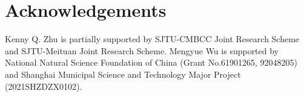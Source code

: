 \section*{Acknowledgements}
Kenny Q. Zhu is partially supported by SJTU-CMBCC Joint Research Scheme and SJTU-Meituan Joint Research Scheme. Mengyue Wu is supported by National Natural Science Foundation of China (Grant No.61901265, 92048205) and Shanghai Municipal Science and Technology Major Project (2021SHZDZX0102).